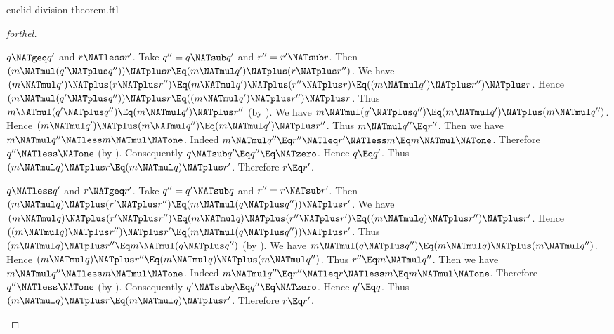 \documentclass{stex}
\begin{document}
\begin{smodule}{euclid-division-theorem.ftl}
\begin{proof}[forthel]
  \begin{case}{$q \NATgeq q'$ and $r \NATless r'$.}
    Take $q'' = q \NATsub q'$ and $r'' = r' \NATsub r$.
    Then $(m \NATmul (q' \NATplus q'')) \NATplus r \Eq (m \NATmul q') \NATplus (r \NATplus r'')$.
    We have $(m \NATmul q') \NATplus (r \NATplus r'')
      \Eq (m \NATmul q') \NATplus (r'' \NATplus r)
      \Eq ((m \NATmul q') \NATplus r'') \NATplus r$.
    Hence $(m \NATmul (q' \NATplus q'')) \NATplus r \Eq ((m \NATmul q') \NATplus r'') \NATplus r$.
    Thus $m \NATmul (q' \NATplus q'') \Eq (m \NATmul q') \NATplus r''$ (by ).
    We have $m \NATmul (q' \NATplus q'') \Eq (m \NATmul q') \NATplus (m \NATmul q'')$.
    Hence $(m \NATmul q') \NATplus (m \NATmul q'') \Eq (m \NATmul q') \NATplus r''$.
    Thus $m \NATmul q'' \Eq r''$.
    Then we have $m \NATmul q'' \NATless m \NATmul \NATone$.
    Indeed $m \NATmul q''
      \Eq r''
      \NATleq r'
      \NATless m
      \Eq m \NATmul \NATone$.
    Therefore $q'' \NATless \NATone$ (by ).
    Consequently $q \NATsub q' \Eq q'' \Eq \NATzero$.
    Hence $q \Eq q'$.
    Thus $(m \NATmul q) \NATplus r \Eq (m \NATmul q) \NATplus r'$.
    Therefore $r \Eq r'$.
  \end{case}

  \begin{case}{$q \NATless q'$ and $r \NATgeq r'$.}
    Take $q'' = q' \NATsub q$ and $r'' = r \NATsub r'$.
    Then $(m \NATmul q) \NATplus (r' \NATplus r'') \Eq (m \NATmul (q \NATplus q'')) \NATplus r'$.
    We have $(m \NATmul q) \NATplus (r' \NATplus r'')
      \Eq (m \NATmul q) \NATplus (r'' \NATplus r')
      \Eq ((m \NATmul q) \NATplus r'') \NATplus r'$.
    Hence $((m \NATmul q) \NATplus r'') \NATplus r' \Eq (m \NATmul (q \NATplus q'')) \NATplus r'$.
    Thus $(m \NATmul q) \NATplus r'' \Eq m \NATmul (q \NATplus q'')$ (by ).
    We have $m \NATmul (q \NATplus q'') \Eq (m \NATmul q) \NATplus (m \NATmul q'')$.
    Hence $(m \NATmul q) \NATplus r'' \Eq (m \NATmul q) \NATplus (m \NATmul q'')$.
    Thus $r'' \Eq m \NATmul q''$.
    Then we have $m \NATmul q'' \NATless m \NATmul \NATone$.
    Indeed $m \NATmul q''
      \Eq r''
      \NATleq r
      \NATless m
      \Eq m \NATmul \NATone$.
    Therefore $q'' \NATless \NATone$ (by ).
    Consequently $q' \NATsub q \Eq q'' \Eq \NATzero$.
    Hence $q' \Eq q$.
    Thus $(m \NATmul q) \NATplus r \Eq (m \NATmul q) \NATplus r'$.
    Therefore $r \Eq r'$.
  \end{case}


\end{proof}
\end{smodule}
\end{document}
